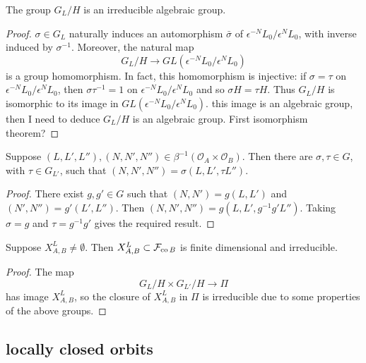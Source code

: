 \documentclass[a4paper, 11pt]{report}
\begin{document}
\begin{lemma}
The group $G_L/H$ is an irreducible algebraic group.
\end{lemma}
\begin{proof}
$\sigma\in G_L$ naturally induces an automorphism $\bar{\sigma}$ of $\epsilon^{-N} L_0/{\epsilon^N L_0}$, with inverse induced by $\sigma^{-1}$. Moreover, the natural map
\begin{equation*}
G_L/H \to GL(\epsilon^{-N}L_0/{\epsilon^N L_0})
\end{equation*}
is a group homomorphism. In fact, this homomorphism is injective: if $\sigma = \tau$ on $\epsilon^{-N}L_0/{\epsilon^N L_0}$, then $\sigma\tau^{-1} = 1$ on $\epsilon^{-N}L_0/{\epsilon^N L_0}$ and so $\sigma H = \tau H$. Thus $G_L/H$ is isomorphic to its image in $GL(\epsilon^{-N}L_0/{\epsilon^N L_0})$. {\color{red}this image is an algebraic group, then I need to deduce $G_L/H$ is an algebraic group. First isomorphism theorem?} 
\end{proof}

\begin{lemma}
Suppose $(L,L',L''),(N,N',N'')\in\beta^{-1}(\mathcal{O}_A\times\mathcal{O}_B)$. Then there are $\sigma,\tau\in G$, with $\tau\in G_{L'}$, such that $(N,N',N'') = \sigma(L,L',\tau L'')$.
\end{lemma}
\begin{proof}
There exist $g,g'\in G$ such that $(N,N') = g(L,L')$ and $(N',N'') = g'(L',L'')$. Then $(N,N',N'') = g(L,L',g^{-1}g' L'')$. Taking $\sigma = g$ and $\tau = g^{-1}g'$ gives the required result.
\end{proof}

\begin{proposition}\label{lemma:irreducibility-orbit-product}
Suppose $X_{A,B}^L\neq\emptyset$. Then $X_{A,B}^L\subset\mathcal{F}_{\operatorname{co}{B}}$ is finite dimensional and irreducible.
\end{proposition}
\begin{proof}
The map
\begin{equation*}
G_L/H\times G_{L'}/H\to\Pi
\end{equation*}
has image $X_{A,B}^L$, so the closure of $X_{A,B}^L$ in $\Pi$ is irreducible {\color{red}due to some properties of the above groups.}
\end{proof}

\subsection{locally closed orbits}
\end{document}
